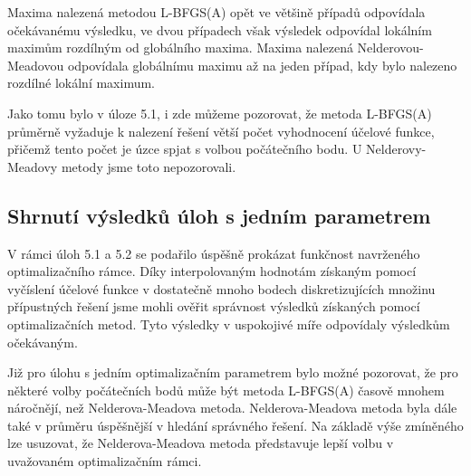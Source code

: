 Maxima nalezená metodou L-BFGS(A) opět ve většině případů odpovídala očekávanému výsledku, ve dvou případech však výsledek odpovídal lokálním maximům rozdílným od globálního maxima. Maxima nalezená Nelderovou-Meadovou odpovídala globálnímu maximu až na jeden případ, kdy bylo nalezeno rozdílné lokální maximum.

Jako tomu bylo v úloze 5.1, i zde můžeme pozorovat, že metoda L-BFGS(A) průměrně vyžaduje k nalezení řešení větší počet vyhodnocení účelové funkce, přičemž tento počet je úzce spjat s volbou počátečního bodu. U Nelderovy-Meadovy metody jsme toto nepozorovali.

\subsection{Shrnutí výsledků úloh s jedním parametrem}
V rámci úloh 5.1 a 5.2 se podařilo úspěšně prokázat funkčnost navrženého optimalizačního rámce.  Díky interpolovaným hodnotám získaným pomocí vyčíslení účelové funkce v dostatečně mnoho bodech diskretizujících množinu přípustných řešení jsme mohli ověřit správnost výsledků získaných pomocí optimalizačních metod. Tyto výsledky v uspokojivé míře odpovídaly výsledkům očekávaným.

Již pro úlohu s jedním optimalizačním parametrem bylo možné pozorovat, že pro některé volby počátečních bodů může být metoda L-BFGS(A) časově mnohem náročnějí, než Nelderova-Meadova metoda. Nelderova-Meadova metoda byla dále také v průměru úspěšnější v hledání správného řešení. Na základě výše zmíněného lze usuzovat, že Nelderova-Meadova metoda představuje lepší volbu v uvažovaném optimalizačním rámci.


\newpage
